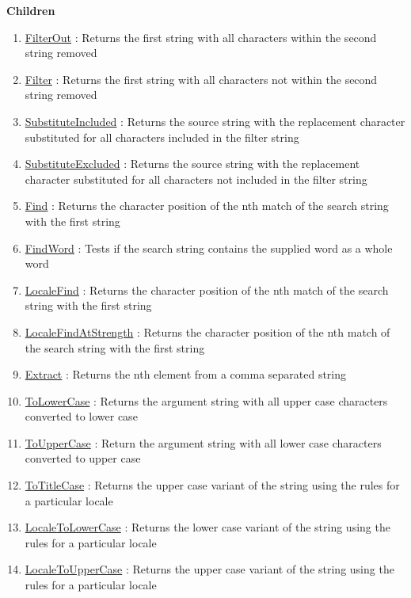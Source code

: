 \textbf{Children}
\begin{enumerate}
\item \hyperlink{ecldoc:uni.filterout}{FilterOut}
: Returns the first string with all characters within the second string removed
\item \hyperlink{ecldoc:uni.filter}{Filter}
: Returns the first string with all characters not within the second string removed
\item \hyperlink{ecldoc:uni.substituteincluded}{SubstituteIncluded}
: Returns the source string with the replacement character substituted for all characters included in the filter string
\item \hyperlink{ecldoc:uni.substituteexcluded}{SubstituteExcluded}
: Returns the source string with the replacement character substituted for all characters not included in the filter string
\item \hyperlink{ecldoc:uni.find}{Find}
: Returns the character position of the nth match of the search string with the first string
\item \hyperlink{ecldoc:uni.findword}{FindWord}
: Tests if the search string contains the supplied word as a whole word
\item \hyperlink{ecldoc:uni.localefind}{LocaleFind}
: Returns the character position of the nth match of the search string with the first string
\item \hyperlink{ecldoc:uni.localefindatstrength}{LocaleFindAtStrength}
: Returns the character position of the nth match of the search string with the first string
\item \hyperlink{ecldoc:uni.extract}{Extract}
: Returns the nth element from a comma separated string
\item \hyperlink{ecldoc:uni.tolowercase}{ToLowerCase}
: Returns the argument string with all upper case characters converted to lower case
\item \hyperlink{ecldoc:uni.touppercase}{ToUpperCase}
: Return the argument string with all lower case characters converted to upper case
\item \hyperlink{ecldoc:uni.totitlecase}{ToTitleCase}
: Returns the upper case variant of the string using the rules for a particular locale
\item \hyperlink{ecldoc:uni.localetolowercase}{LocaleToLowerCase}
: Returns the lower case variant of the string using the rules for a particular locale
\item \hyperlink{ecldoc:uni.localetouppercase}{LocaleToUpperCase}
: Returns the upper case variant of the string using the rules for a particular locale

\end{enumerate}
